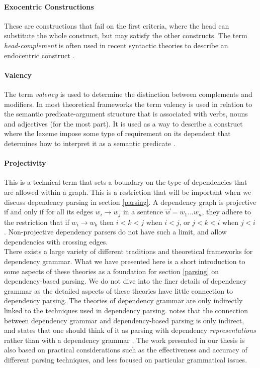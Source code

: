 \paragraph{Exocentric Constructions} These are constructions that fail on the first criteria, where the head can substitute the whole construct, but may satisfy the other constructs. The term \textit{head-complement} is often used in recent syntactic theories to describe an endocentric construct \cite{Niv:05}.

\paragraph{Valency} The term \textit{valency} is used to determine the distinction between complements and modifiers. In most theoretical frameworks the term valency is used in relation to the semantic predicate-argument structure that is associated with verbs, nouns and adjectives (for the most part). It is used as a way to describe a construct where the lexeme impose some type of requirement on its dependent that determines how to interpret it as a semantic predicate \cite{Niv:05}.

\paragraph{Projectivity} This is a technical term that sets a boundary on the type of dependencies that are allowed within a graph. This is a restriction that will be important when we discuss dependency parsing in section \ref{parsing}. A dependency graph is projective if and only if for all its edges $w_i \rightarrow w_j$ in a sentence $\vec{w} = w_1 ... w_n$, they adhere to the restriction that if $w_i \rightarrow w_k$ then $i < k < j$ when $i < j$, or $j < k < i$ when $j < i$ \cite{KublerEtAl:09}. Non-projective dependency parsers do not have such a limit, and allow dependencies with crossing edges. \\

There exists a large variety of different traditions and theoretical frameworks for dependency grammar. What we have presented here is a short introduction to some aspects of these theories as a foundation for section \ref{parsing} on dependency-based parsing. We do not dive into the finer details of dependency grammar as the detailed aspects of these theories have little connection to dependency parsing. The theories of dependency grammar are only indirectly linked to the techniques used in dependency parsing. \citeauthor{Niv:05} notes that the connection between dependency grammar and dependency-based parsing is only indirect, and states that one should think of it as parsing with dependency \textit{representations} rather than with a dependency grammar \cite{Niv:05}. The work presented in our thesis is also based on practical considerations such as the effectiveness and accuracy of different parsing techniques, and less focused on particular grammatical issues.


